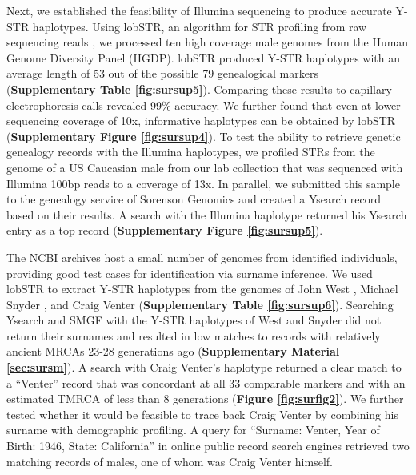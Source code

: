 Next, we established the feasibility of Illumina sequencing to produce accurate Y-STR haplotypes. Using lobSTR, an algorithm for STR profiling from raw sequencing reads \cite{GymrekGolanRossetEtAl2012}, we processed ten high coverage male genomes from the Human Genome Diversity Panel (HGDP). lobSTR produced Y-STR haplotypes with an average length of 53 out of the possible 79 genealogical markers (\textbf{Supplementary Table \ref{fig:sursup5}}). Comparing these results to capillary electrophoresis calls revealed 99\% accuracy. We further found that even at lower sequencing coverage of 10x, informative haplotypes can be obtained by lobSTR (\textbf{Supplementary Figure \ref{fig:sursup4}}). To test the ability to retrieve genetic genealogy records with the Illumina haplotypes, we profiled STRs from the genome of a US Caucasian male from our lab collection that was sequenced with Illumina 100bp reads to a coverage of 13x. In parallel, we submitted this sample to the genealogy service of Sorenson Genomics and created a Ysearch record based on their results. A search with the Illumina haplotype returned his Ysearch entry as a top record (\textbf{Supplementary Figure \ref{fig:sursup5}}).

The NCBI archives host a small number of genomes from identified individuals, providing good test cases for identification via surname inference. We used lobSTR to extract Y-STR haplotypes from the genomes of John West \cite{LeatEhrenreichBenjeddouEtAl2007}, Michael Snyder \cite{LimXueParkinEtAl2007}, and Craig Venter \cite{LevySuttonNgEtAl2007} (\textbf{Supplementary Table \ref{fig:sursup6}}). Searching Ysearch and SMGF with the Y-STR haplotypes of West and Snyder did not return their surnames and resulted in low matches to records with relatively ancient MRCAs 23-28 generations ago (\textbf{Supplementary Material \ref{sec:sursm}}). A search with Craig Venter's haplotype returned a clear match to a ``Venter'' record that was concordant at all 33 comparable markers and with an estimated TMRCA of less than 8 generations (\textbf{Figure \ref{fig:surfig2}}). We further tested whether it would be feasible to trace back Craig Venter by combining his surname with demographic profiling. A query for ``Surname: Venter, Year of Birth: 1946, State: California'' in online public record search engines retrieved two matching records of males, one of whom was Craig Venter himself. 

